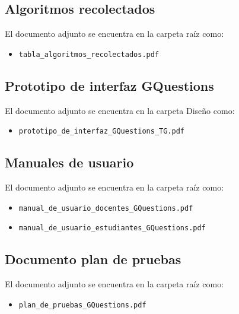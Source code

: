 \documentclass[../Main.tex]{subfiles}
\begin{document}
\begin{justify}
\subsection*{Algoritmos recolectados}
El documento adjunto se encuentra en la carpeta raíz como:
\begin{itemize}
    \item \texttt{tabla\_algoritmos\_recolectados.pdf}
\end{itemize}
\end{justify}

\subsection*{Prototipo de interfaz GQuestions}
\begin{justify}
El documento adjunto se encuentra en la carpeta Diseño como:
\begin{itemize}
    \item \texttt{prototipo\_de\_interfaz\_GQuestions\_TG.pdf}
\end{itemize}
\end{justify}

\subsection*{Manuales de usuario}
\begin{justify}
El documento adjunto se encuentra en la carpeta raíz como:
\begin{itemize}
    \item \texttt{manual\_de\_usuario\_docentes\_GQuestions.pdf}
    
    \item \texttt{manual\_de\_usuario\_estudiantes\_GQuestions.pdf}
\end{itemize}
\end{justify}

\subsection*{Documento plan de pruebas}
\begin{justify}
El documento adjunto se encuentra en la carpeta raíz como:
\begin{itemize}
    \item \texttt{plan\_de\_pruebas\_GQuestions.pdf}
\end{itemize}
\end{justify}
\end{document}
